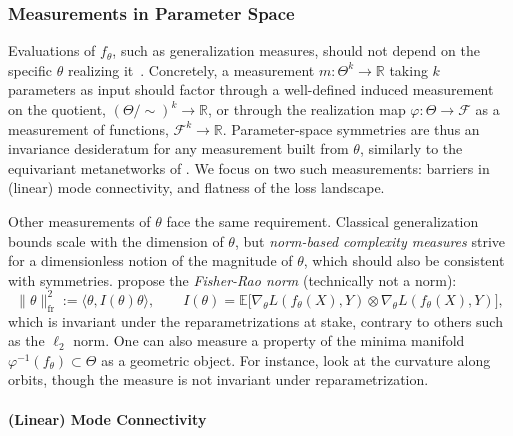\documentclass[mathematics,review,submit,moreauthors]{Definitions/mdpi}
\begin{document}
\subsubsection{Measurements in Parameter Space}\label{sec:measurements-param-space}
Evaluations of $f_\theta$, such as generalization measures, should not depend on the specific $\theta$ realizing it~\citep{dinh2017}.
Concretely, a measurement $m:\Theta^k\to\mathbb R$ taking $k$ parameters as input should factor through a well-defined induced measurement on the quotient, $(\Theta/\!\sim)^k\to\mathbb R$, or through the realization map $\varphi:\Theta\to\mathcal F$ as a measurement of functions, $\mathcal F^k\to\mathbb R$.
Parameter-space symmetries are thus an invariance desideratum for any measurement built from $\theta$, similarly to the equivariant metanetworks of .
We focus on two such measurements: barriers in (linear) mode connectivity, and flatness of the loss landscape.

\begin{Remark}
    Other measurements of $\theta$ face the same requirement.
    Classical generalization bounds scale with the dimension of $\theta$, but \emph{norm-based complexity measures} strive for a dimensionless notion of the magnitude of $\theta$, which should also be consistent with symmetries.
    \citet{liang2019pticais} propose the \emph{Fisher-Rao norm} (technically not a norm):
    \begin{equation*}
        \lVert\theta\rVert_{\mathrm{fr}}^2:=\langle\theta,I(\theta)\theta\rangle,\qquad I(\theta)=\mathbb E\big[\nabla_\theta L(f_\theta(X),Y)\otimes\nabla_\theta L(f_\theta(X),Y)\big],
    \end{equation*}
    which is invariant under the reparametrizations at stake, contrary to others such as the $\ell_2$ norm.
    One can also measure a property of the minima manifold $\varphi^{-1}(f_\theta)\subset\Theta$ as a geometric object.
    For instance, \citet{zhao2024} look at the curvature along orbits, though the measure is not invariant under reparametrization.
\end{Remark}

\paragraph{(Linear) Mode Connectivity}\label{sec:mode-connectivity}
\end{document}
